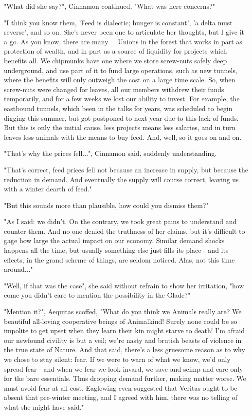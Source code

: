 
"What did she say?", Cinnamon continued, "What was here concerns?"

"I think you know them, 'Feed is dialectic; hunger is constant', 'a delta must reverse', and so on. She's never been one to articulate her thoughts, but I give it a go. As you know, there are many _ Unions in the forest that works in part as protection of wealth, and in part as a source of liquidity for projects which benefits all. We chipmunks have one where we store screw-nuts safely deep underground, and use part of it to fund large operations, such as new tunnels, where the benefits will only outweigh the cost on a large time scale. So, when screw-nuts were changed for leaves, all our members withdrew their funds temporarily, and for a few weeks we lost our ability to invest. For example, the eastbound tunnels, which been in the talks for years, was scheduled to begin digging this summer, but got postponed to next year due to this lack of funds.
   But this is only the initial cause, less projects means less salaries, and in turn leaves less animals with the means to buy feed. And, well, so it goes on and on.

"That's why the prices fell...", Cinnamon said, suddenly understanding.

"That's correct, feed prices fell not because an increase in supply, but because the reduction in demand. And eventually the supply will course correct, leaving us with a winter dearth of feed."


"But this sounds more than plausible, how could you dismiss them?"

"As I said: we didn't. On the contrary, we took great pains to understand and counter them. And no one denied the truthness of her claims, but it's difficult to gage how large the actual impact on our economy. Similar demand shocks happens all the time, but usually something else just fills its place - and its effects, in the grand scheme of things, are seldom noticed. Alas, not this time around..."

"Well, if that was the case", she said without refrain to show her irritation, "how come you didn't care to mention the possibility in the Glade?"

"Mention it?", Aequitas scoffed, "What do you think we Animals really are? We beautiful all-loving cooperative beings of Animalkind! Surely none could be so impolite to get upset when they learn their kin might starve to death! I'm afraid our newfound civility is but a veil; we're nasty and brutish beasts of violence in the true state of Nature.
  And that said, there's a less gruesome reason as to why we chose to stay silent: fear. If we were to warn of what we know, we'd only 
spread fear - and when we fear we look invard, we save and scimp and care only for the bare essentials. Thus dropping demand further, making matter worse. We must avoid fear at all cost. Eaglewing even suggested that Veritas ought to be absent that pre-winter meeting, and I agreed with him, there was no telling of what she might have said."

